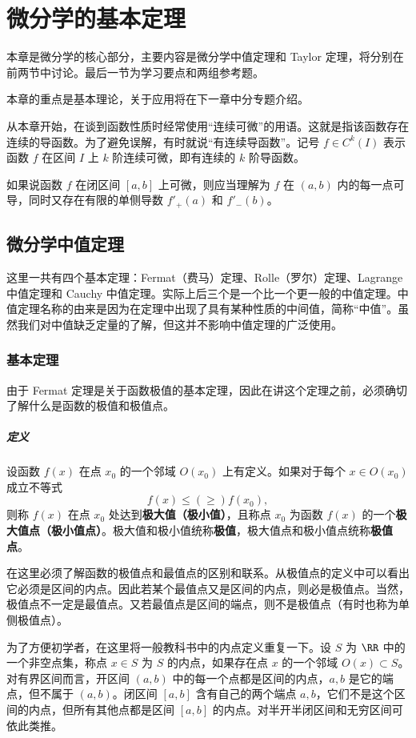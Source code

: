 \chapter{微分学的基本定理}

本章是微分学的核心部分，主要内容是微分学中值定理和 Taylor 定理，将分别在前两节中讨论。最后一节为学习要点和两组参考题。

本章的重点是基本理论，关于应用将在下一章中分专题介绍。

从本章开始，在谈到函数性质时经常使用“连续可微”的用语。这就是指该函数存在连续的导函数。为了避免误解，有时就说“有连续导函数”。记号 $f\in C^k(I)$ 表示函数 $f$ 在区间 $I$ 上 $k$ 阶连续可微，即有连续的 $k$ 阶导函数。

如果说函数 $f$ 在闭区间 $[a,b]$ 上可微，则应当理解为 $f$ 在 $(a,b)$ 内的每一点可导，同时又存在有限的单侧导数 $f'_+(a)$ 和 $f'_-(b)$。

\section{微分学中值定理}

这里一共有四个基本定理：Fermat（费马）定理、Rolle（罗尔）定理、Lagrange 中值定理和 Cauchy 中值定理。实际上后三个是一个比一个更一般的中值定理。中值定理名称的由来是因为在定理中出现了具有某种性质的中间值，简称“中值”。虽然我们对中值缺乏定量的了解，但这并不影响中值定理的广泛使用。

\subsection{基本定理}

由于 Fermat 定理是关于函数极值的基本定理，因此在讲这个定理之前，必须确切了解什么是函数的极值和极值点。

\paragraph{定义}
设函数 $f(x)$ 在点 $x_0$ 的一个邻域 $O(x_0)$ 上有定义。如果对于每个 $x\in O(x_0)$ 成立不等式
\[
  f(x)\leqslant (\geqslant) f(x_0),
\]
则称 $f(x)$ 在点 $x_0$ 处达到\textbf{极大值（极小值）}，且称点 $x_0$ 为函数 $f(x)$ 的一个\textbf{极大值点（极小值点）}。极大值和极小值统称\textbf{极值}，极大值点和极小值点统称\textbf{极值点}。

\begin{xremark}
在这里必须了解函数的极值点和最值点的区别和联系。从极值点的定义中可以看出它必须是区间的内点。因此若某个最值点又是区间的内点，则必是极值点。当然，极值点不一定是最值点。又若最值点是区间的端点，则不是极值点（有时也称为单侧极值点）。

为了方便初学者，在这里将一般教科书中的内点定义重复一下。设 $S$ 为 $\RR$ 中的一个非空点集，称点 $x\in S$ 为 $S$ 的内点，如果存在点 $x$ 的一个邻域 $O(x)\subset S$。对有界区间而言，开区间 $(a,b)$ 中的每一个点都是区间的内点，$a,b$ 是它的端点，但不属于 $(a,b)$。闭区间 $[a,b]$ 含有自己的两个端点 $a,b$，它们不是这个区间的内点，但所有其他点都是区间 $[a,b]$ 的内点。对半开半闭区间和无穷区间可依此类推。
\end{xremark}


